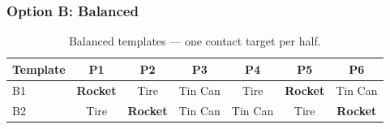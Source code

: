 \documentclass[a4]{article}
\begin{document}
\subsubsection*{Option B: Balanced}

\begin{table}[H]
\centering
\begin{tabular}{lcccccc}
\toprule
\textbf{Template} & \textbf{P1} & \textbf{P2} & \textbf{P3} & \textbf{P4} & \textbf{P5} & \textbf{P6} \\
\midrule
B1 & \textbf{Rocket} & Tire & Tin Can & Tire & \textbf{Rocket} & Tin Can \\
B2 & Tire & \textbf{Rocket} & Tin Can & Tin Can & Tire & \textbf{Rocket} \\
\bottomrule
\end{tabular}
\caption{Balanced templates --- one contact target per half.}
\end{table}
\end{document}
